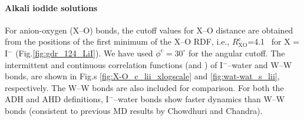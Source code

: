 \paragraph{Alkali iodide solutions}\label{PARAGRAPH_I--W}
For anion-oxygen (X--O) bonds, the cutoff values for X--O distance are obtained from the positions of the first
minimum of the X--O RDF, i.e., $R_\text{XO}^\text{c}$=4.1 \A\ for X = I$^-$ (Fig.\thinspace\ref{fig:gdr_124_LiI}). 
We have used $\phi^\text{c} = 30^{\circ}$ for the angular cutoff\cite{Chowdhuri2006}.
The intermittent and continuous correlation functions (\CHB and \SHB) of I$^-$--water and W--W bonds,
are shown in Fig.s \thinspace\ref{fig:X-O_c_lii_xlogscale} and \ref{fig:wat-wat_s_lii}, respectively. 
The W--W bonds are also included for comparison.
For both the ADH and AHD definitions, I$^-$--water bonds show faster dynamics 
than W--W bonds\cite{Chowdhuri2006} (consistent to previous MD results by Chowdhuri and Chandra).

